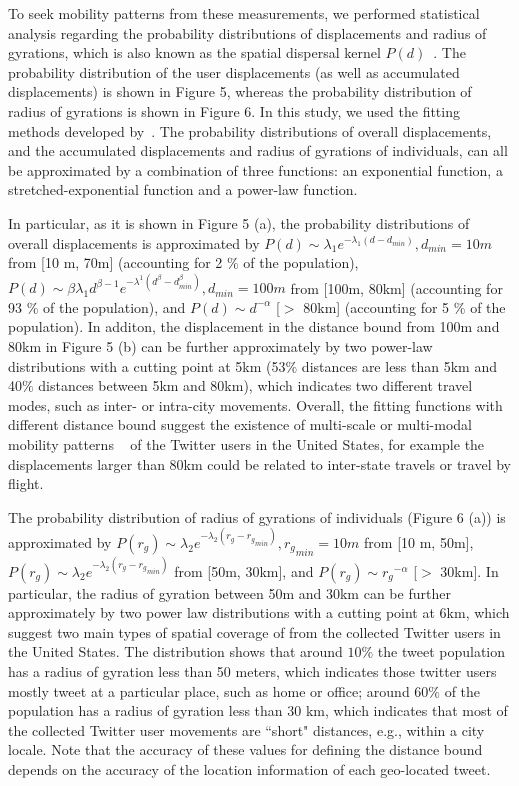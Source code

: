 \documentclass[a4paper, 11pt]{article}
\begin{document}
To seek mobility patterns from these measurements, we performed statistical analysis regarding the probability distributions of displacements and radius of gyrations, which is also known as the spatial dispersal kernel $P(d)$~\citep{brockmann2006scaling}. The probability distribution of the user displacements (as well as accumulated displacements) is shown in Figure 5, whereas the probability distribution of radius of gyrations is shown in Figure 6. In this study, we used the fitting methods developed by~\citep{Jurdak2015}. The probability distributions of overall displacements, and the accumulated displacements and radius of gyrations of individuals, can all be approximated by a combination of three functions: an exponential function, a stretched-exponential function and a power-law function.

In particular, as it is shown in Figure 5 (a), the probability distributions of overall displacements is approximated by $P(d) \sim \lambda_{1} e^{-\lambda_{1}(d - d_{min})}, d_{min}=10m$ from [10 m, 70m] (accounting for 2 $\%$ of the population),  $ P(d) \sim \beta\lambda_{1}d^{\beta-1}e^{-\lambda^{1}(d^\beta-d_{min}^\beta)}, d_{min} = 100m$ from [100m, 80km] (accounting for 93 $\%$ of the population), and $P(d) \sim {d}^{-\alpha}$ [$>$ 80km] (accounting for 5 $\%$ of the population). In additon, the displacement in the distance bound from 100m and 80km in Figure 5 (b) can be further approximately by two power-law distributions with a cutting point at 5km (53$\%$ distances are less than 5km and 40$\%$ distances between 5km and 80km), which indicates two different travel modes, such as inter- or intra-city movements.
Overall, the fitting functions with different distance bound suggest the existence of multi-scale or multi-modal mobility patterns ~\citep{Jurdak2015} of the Twitter users in the United States, for example the displacements larger than 80km could be related to inter-state travels or travel by flight. 

The probability distribution of radius of gyrations of individuals (Figure 6 (a)) is approximated by $P(r_{g}) \sim \lambda_{2} e^{-\lambda_{2}(r_{g} - {r_{g}}_{min})}, {r_{g}}_{min}=10m$ from [10 m, 50m], $P(r_{g}) \sim \lambda_{2} e^{-\lambda_{2}(r_{g} - {r_{g}}_{min})}$ from [50m, 30km], and $P(r_{g}) \sim {r_{g}}^{-\alpha}$ [$>$ 30km]. In particular, the radius of gyration between 50m and 30km can be further approximately by two power law distributions with a cutting point at 6km, which suggest two main types of spatial coverage of from the collected Twitter users in the United States. The distribution shows that around $10\%$ the tweet population has a radius of gyration less than 50 meters, which indicates those twitter users mostly tweet at a particular place, such as home or office;  around 60$\%$ of the population has a radius of gyration less than 30 km, which indicates that most of the collected Twitter user movements are ``short" distances, e.g., within a city locale. Note that the accuracy of these values for defining the distance bound depends on the accuracy of the location information of each geo-located tweet. 
\end{document}
